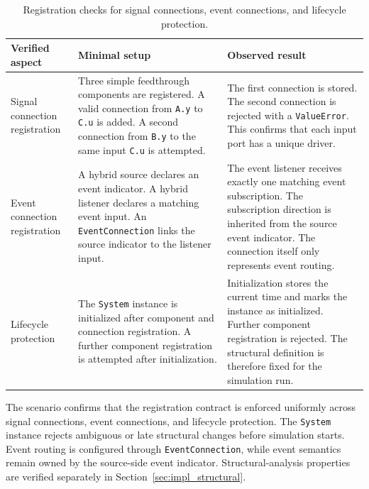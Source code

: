 \begin{table}[t]
  \centering
  \small
  \caption[Registration checks]{Registration checks for signal connections, event connections, and lifecycle protection.}
  \label{tab:system_verification}
  \begin{tabular}{p{3.2cm} p{6cm} p{6cm}}
    \toprule
    \textbf{Verified aspect} & \textbf{Minimal setup} & \textbf{Observed result} \\
    \midrule
    Signal connection registration
      & Three simple feedthrough components are registered.
        A valid connection from \texttt{A.y} to \texttt{C.u} is added.
        A second connection from \texttt{B.y} to the same input \texttt{C.u} is attempted.
      & The first connection is stored.
        The second connection is rejected with a \texttt{ValueError}.
        This confirms that each input port has a unique driver. \\
    \addlinespace

    Event connection registration
      & A hybrid source declares an event indicator.
        A hybrid listener declares a matching event input.
        An \texttt{EventConnection} links the source indicator to the listener input.
      & The event listener receives exactly one matching event subscription.
        The subscription direction is inherited from the source event indicator.
        The connection itself only represents event routing. \\
    \addlinespace

    Lifecycle protection
      & The \texttt{System} instance is initialized after component and connection registration.
        A further component registration is attempted after initialization.
      & Initialization stores the current time and marks the instance as initialized.
        Further component registration is rejected.
        The structural definition is therefore fixed for the simulation run. \\
    \bottomrule
  \end{tabular}
\end{table}

The scenario confirms that the registration contract is enforced uniformly across signal connections, event connections, and lifecycle protection.
The \texttt{System} instance rejects ambiguous or late structural changes before simulation starts.
Event routing is configured through \texttt{EventConnection}, while event semantics remain owned by the source-side event indicator.
Structural-analysis properties are verified separately in Section~\ref{sec:impl_structural}.
